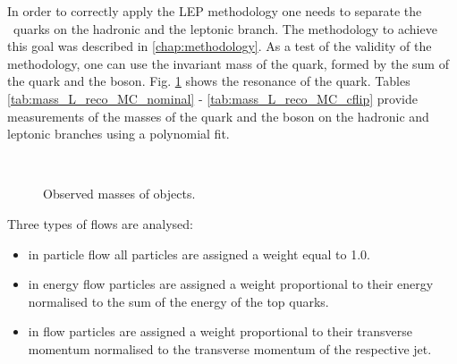 \label{sec:LEP_methodology}
In order to correctly apply the LEP methodology one needs to separate the \cPqb\ quarks on the hadronic and the leptonic branch. The methodology to achieve this goal was described in \ref{chap:methodology}. As a test of the validity of the methodology, one can use the invariant mass of the \cPqt quark, formed by the sum of the \cPqb quark and the \PW boson. Fig. \ref{fig:L_jet_mass_reco} shows the resonance of the \cPqt quark. Tables \ref{tab:mass_L_reco_MC_nominal} - \ref{tab:mass_L_reco_MC_cflip} provide measurements of the masses of the \cPqt quark and the \PW boson on the hadronic and leptonic branches using a polynomial fit.

  \begin{figure}[hbtp]
    \def\twidth{0.45}
    \hfil
  \\

 \hfil
 \caption{Observed masses of objects.}
  \label{fig:L_jet_mass_reco}
\end{figure}









Three types of flows are analysed:
\begin{itemize}
\item in particle flow all particles are assigned a weight equal to 1.0.
\item in energy flow particles are assigned a weight proportional to their energy normalised to the sum of the energy of the top quarks.
\item in \pt flow particles are assigned a weight proportional to their transverse momentum normalised to the transverse momentum of the respective jet.
\end{itemize}

